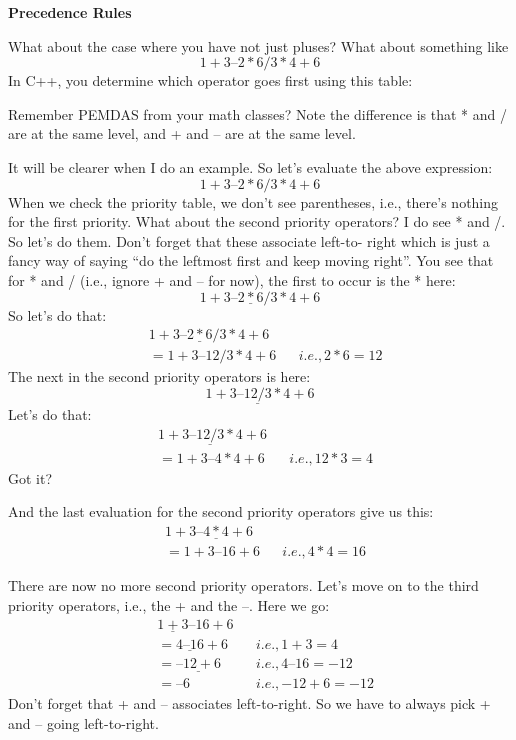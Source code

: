 \textbf{{Precedence Rules}}

What about the case where you have not just pluses? What about
something like
\[1+3–2*6/3*4+6\]
In C++, you determine which operator goes first using this table:

\noindent{}

Remember PEMDAS from your math classes? Note the difference is that
* and / are at the same level, and + and – are at the same level.

%

It will be clearer when I do an example. So let's evaluate the above
expression:
\[1+3–2*6/3*4+6\]
When we check the priority table, we don't see parentheses, i.e., there's
nothing for the first priority. What about the second priority operators? I
do see * and /. So let's do them. Don't forget that these associate left-to-
right which is just a fancy way of saying “do the leftmost first and keep
moving right”. You see that for * and / (i.e., ignore + and – for now), the
first to occur is the * here:
\[1+3–\underline{2*6}/ 3*4+6\]
So let's do that:
\begin{align*}
  &1+3–\underline{2*6}/ 3*4+6\\
  &= 1 + 3 – 12 / 3 * 4 + 6 & &i.e., 2 * 6 = 12
\end{align*}
The next in the second priority operators is here:
\[1 + 3 – \underline{12 / 3} * 4 + 6\]
Let's do that:
\begin{align*}
  &1 + 3 – \underline{12 / 3} * 4 + 6\\
  &=1+3–4*4+6 & &i.e., 12 * 3 = 4
\end{align*}
Got it?

And the last evaluation for the second priority operators give us this:
\begin{align*}
&1+3–\underline{4*4}+6\\
&= 1 + 3 – 16 + 6 & &i.e., 4 * 4 = 16
  \end{align*}
    
There are now no more second priority operators. Let's move on to the
third priority operators, i.e., the + and the –. Here we go:
\begin{align*}
  &\underline{1 + 3} – 16 + 6 \\
  &= \underline{4 – 16} + 6 & &i.e., 1 + 3 = 4 \\
  &= \underline{–12 + 6} & &i.e., 4 – 16 = -12 \\
  &= –6 & &i.e., -12 + 6 = -12
\end{align*}
Don't forget that + and – associates left-to-right. So we have to always
pick + and – going left-to-right.

